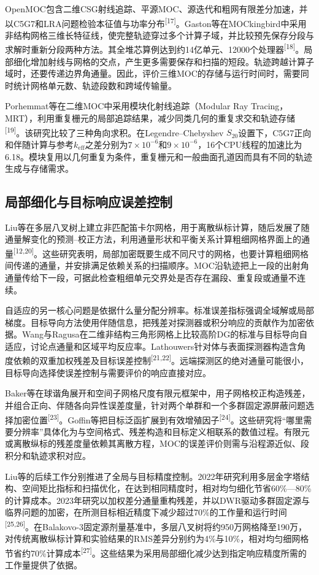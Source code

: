 \documentclass[UTF8, zihao=-4, fontset=none, a4paper]{ctexart}
\newcommand{\upcite}[1]{\textsuperscript{[#1]}}
\begin{document}
OpenMOC包含二维CSG射线追踪、平源MOC、源迭代和粗网有限差分加速，并以C5G7和LRA问题检验本征值与功率分布\upcite{17}。Gaston等在MOCkingbird中采用非结构网格三维长特征线，使完整轨迹穿过多个计算子域，并比较预先保存分段与求解时重新分段两种方法。其全堆芯算例达到约14亿单元、12000个处理器\upcite{18}。局部细化增加射线与网格的交点，产生更多需要保存和扫描的短段。轨迹跨越计算子域时，还要传递边界角通量。因此，评价三维MOC的存储与运行时间时，需要同时统计网格单元数、轨迹段数和跨域传输量。

Porhemmat等在二维MOC中采用模块化射线追踪（Modular Ray Tracing，MRT），利用重复栅元的局部追踪结果，减少同类几何的重复求交和轨迹存储\upcite{19}。该研究比较了三种角向求积。在Legendre--Chebyshev $S_{20}$设置下，C5G7正向和伴随计算与参考$k_{\mathrm{eff}}$之差分别为$7\times10^{-6}$和$9\times10^{-6}$，16个CPU线程的加速比为6.18。模块复用以几何重复为条件，重复栅元和一般曲面孔道因而具有不同的轨迹生成与存储需求。

\subsection{局部细化与目标响应误差控制}

Liu等在多层八叉树上建立非匹配笛卡尔网格，用于离散纵标计算，随后发展了随通量解变化的预测--校正方法，利用通量形状和平衡关系计算粗细网格界面上的通量\upcite{12,20}。这些研究表明，局部加密既要生成不同尺寸的网格，也要计算粗细网格间传递的通量，并安排满足依赖关系的扫描顺序。MOC沿轨迹把上一段的出射角通量传给下一段，可据此检查粗细单元交界处是否存在漏段、重复段或通量不连续。

自适应的另一核心问题是依据什么量分配分辨率。标准误差指标强调全域解或局部梯度。目标导向方法使用伴随信息，把残差对探测器或积分响应的贡献作为加密依据。Wang与Ragusa在二维非结构三角形网格上比较高阶DG的标准与目标导向自适应，讨论点通量和区域平均反应率。Lathouwers针对体与表面探测器构造含角度依赖的双重加权残差及目标误差控制\upcite{21,22}。远端探测区的绝对通量可能很小，目标导向选择使误差控制与需要评价的响应直接对应。

Baker等在球谐角展开和空间子网格尺度有限元框架中，用子网格校正构造残差，并组合正向、伴随各向异性误差度量，针对两个单群和一个多群固定源屏蔽问题选择加密位置\upcite{23}。Goffin等把目标泛函扩展到有效增殖因子\upcite{24}。这些研究将“哪里需要分辨率”具体化为与空间格式、残差构造和目标定义相联系的数值过程。有限元或离散纵标的残差度量依赖其离散方程，MOC的误差评价则需与沿程源近似、段积分和轨迹求积对应。

Liu等的后续工作分别推进了全局与目标精度控制。2022年研究利用多层金字塔结构、空间矩比指标和扫描优化，在达到相同精度时，相对均匀细化节省60\%---80\%的计算成本。2023年研究以加权差分通量重构残差，并以DWR驱动多群固定源与临界问题的加密，在所测目标相近精度下减少超过70\%的工作量和运行时间\upcite{25,26}。在Balakovo-3固定源剂量基准中，多层八叉树将约950万网格降至190万，对传统离散纵标计算和实验结果的RMS差异分别约为4\%与10\%，相对均匀细网格节省约70\%计算成本\upcite{27}。这些结果为采用局部细化减少达到指定响应精度所需的工作量提供了依据。
\end{document}
